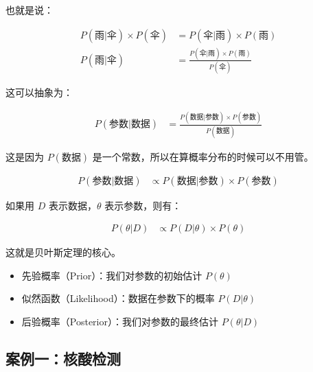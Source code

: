 \documentclass[UTF8]{ctexart}
\begin{document}
也就是说：

\begin{equation}
	\begin{aligned}
		P(\text{雨}|\text{伞}) \times P(\text{伞}) & = P(\text{伞}|\text{雨}) \times P(\text{雨})                     \\
		P(\text{雨}|\text{伞})                    & = \frac{P(\text{伞}|\text{雨}) \times P(\text{雨})}{P(\text{伞})}
	\end{aligned}
\end{equation}

这可以抽象为：

\begin{equation}
	\begin{aligned}
		P(\text{参数}|\text{数据}) & = \frac{P(\text{数据}|\text{参数}) \times P(\text{参数})}{P(\text{数据})}
	\end{aligned}
\end{equation}

这是因为 $P(\text{数据})$ 是一个常数，所以在算概率分布的时候可以不用管。

\begin{equation}
	\begin{aligned}
		P(\text{参数}|\text{数据}) & \propto P(\text{数据}|\text{参数}) \times P(\text{参数})
	\end{aligned}
\end{equation}

如果用 $D$ 表示数据，$\theta$ 表示参数，则有：

\begin{equation}
	\begin{aligned}
		P(\theta|D) & \propto P(D|\theta) \times P(\theta)
	\end{aligned}
\end{equation}

这就是贝叶斯定理的核心。

\begin{itemize}
	\item 先验概率（Prior）：我们对参数的初始估计 $P(\theta)$
	\item 似然函数（Likelihood）：数据在参数下的概率 $P(D|\theta)$
	\item 后验概率（Posterior）：我们对参数的最终估计 $P(\theta|D)$
\end{itemize}

\subsection{案例一：核酸检测}
\end{document}
